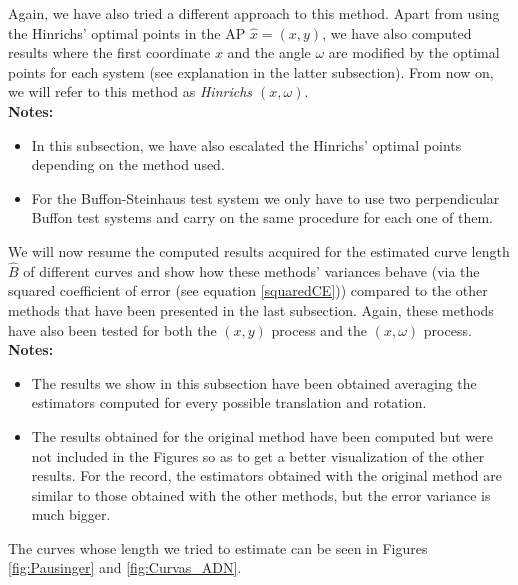 Again, we have also tried a different approach to this method. Apart from using the Hinrichs' optimal points in the AP $\widehat{x}=(x,y)$, we have also computed results where the first coordinate $x$ and the angle $\omega$ are modified by the optimal points for each system (see explanation in the latter subsection). From now on, we will refer to this method as \textit{Hinrichs $(x,\omega)$}. \\

\textbf{Notes:} 
\begin{itemize}
    \item In this subsection, we have also escalated the Hinrichs' optimal points depending on the method used.
    \item For the Buffon-Steinhaus test system we only have to use two perpendicular Buffon test systems and carry on the same procedure for each one of them.
\end{itemize}

\vspace{2mm}
We will now resume the computed results acquired for the estimated curve length $\widehat{B}$ of different curves and show how these methods' variances behave (via the squared coefficient of error (see equation \eqref{squaredCE})) compared to the other methods that have been presented in the last subsection. Again, these methods have also been tested for both the $(x,y)$ process and the $(x,\omega)$ process.\\

\textbf{Notes:} 
\begin{itemize}
    \item The results we show in this subsection have been obtained averaging the estimators computed for every possible translation and rotation.
    \item The results obtained for the original method have been computed but were not included in the Figures so as to get a better visualization of the other results. For the record, the estimators obtained with the original method are similar to those obtained with the other methods, but the error variance is much bigger.
\end{itemize}
\vspace{2mm}

The curves whose length we tried to estimate can be seen in Figures \ref{fig:Pausinger} and \ref{fig:Curvas_ADN}.\\


